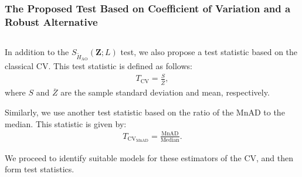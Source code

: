 \documentclass[aspectratio=1610,10pt]{beamer}
\begin{document}
\begin{frame} \frametitle{{ The Proposed Test Based on Coefficient of Variation and a Robust Alternative}}\vspace{-0.1cm}

\justifying
\begin{columns}[T,onlytextwidth]
    \begin{column}{.8\textwidth}
			\begin{exampleblock}{}\justifying
In addition to the \(S_{\widetilde{H}_{\text{AO}}}(\bm{Z}; L)\) test, we
also propose a test statistic based on the classical CV. This test
statistic is defined as follows: \begin{align}
    T_{\text{CV}}=\frac{S}{\overline{Z}},
\end{align} where \(S\) and \(\overline{Z}\) are the sample standard
deviation and mean, respectively.


Similarly, we use another test statistic based on the ratio of the MnAD
to the median. This statistic is given by: \begin{align}
    T_{\text{CV}_{\text{MnAD}}}=\frac{\text{MnAD}}{\text{Median}}.
\end{align}

We proceed to identify suitable models for these estimators of the CV,
and then form test statistics.
		 
	\end{exampleblock}
	
		
    \end{column}
    
\end{columns}\vspace{0.2cm}

\end{frame} 
\end{document}

